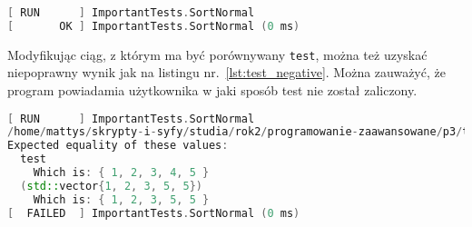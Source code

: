 \begin{lstlisting}[caption=Poprawny wynik testu, label={lst:test_positive}, language=C++]
[ RUN      ] ImportantTests.SortNormal
[       OK ] ImportantTests.SortNormal (0 ms)
\end{lstlisting}

Modyfikując ciąg, z którym ma być porównywany \texttt{test}, można też uzyskać niepoprawny wynik jak na listingu nr.~\ref{lst:test_negative}. Można zauważyć, że program powiadamia użytkownika w jaki sposób test nie został zaliczony.

\begin{lstlisting}[caption=Niepoprawny wynik testu, label={lst:test_negative}, language=C++]
[ RUN      ] ImportantTests.SortNormal
/home/mattys/skrypty-i-syfy/studia/rok2/programowanie-zaawansowane/p3/tests/tests.cpp:11: Failure
Expected equality of these values:
  test
    Which is: { 1, 2, 3, 4, 5 }
  (std::vector{1, 2, 3, 5, 5})
    Which is: { 1, 2, 3, 5, 5 }
[  FAILED  ] ImportantTests.SortNormal (0 ms)
\end{lstlisting}
